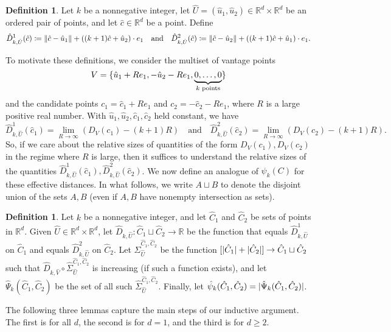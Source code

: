 \documentclass[11pt]{amsart}
\theoremstyle{definition}
\newtheorem{definition}[theorem]{Definition}
\DeclarePairedDelimiter{\set}{\{}{\}}
\DeclarePairedDelimiter{\abs}{\lvert}{\rvert}
\DeclarePairedDelimiter{\Abs}{\lVert}{\rVert}
\newcommand{\RR}{\mathbb{R}}
\begin{document}
\begin{definition}
Let $k$ be a nonnegative integer, let $\hat U = (\hat u_1, \hat u_2) \in \RR^d \times \RR^d$ be an ordered pair of points, and let $\hat c\in\RR^d$ be a point.  Define
\[
\hat{D}^1_{k,\hat U}(\hat c) \coloneqq \Abs{\hat c - \hat u_1} + ((k+1)\hat c + \hat u_2) \cdot  e_1 \quad\text{and}\quad
\hat{D}^2_{k,\hat U}(\hat c) \coloneqq \Abs{\hat c - \hat u_2} + ((k+1)\hat c + \hat u_1) \cdot e_1.
\]
\end{definition}

To motivate these definitions,
we consider the multiset of vantage points \[V = \set{\hat u_1 + Re_1, -\hat u_2 - Re_1, \underbrace{0,\ldots,0}_{k\text{ points}}}\] and the candidate points $c_1 = \hat c_1 + Re_1$ and $c_2 = -\hat c_2 - Re_1$, where $R$ is a large positive real number.  With $\hat u_1, \hat u_2, \hat c_1, \hat c_2$ held constant, we have
\[\hat{D}_{k,\hat U}^1(\hat c_1) = \lim\limits_{R \to \infty} (D_{V}(c_1) - (k+1)R) \quad\text{and}\quad
\hat{D}_{k,\hat U}^2(\hat c_2) = \lim\limits_{R \to \infty} (D_{V}(c_2) - (k+1)R).\]
So, if we care about the relative sizes of quantities of the form $D_V(c_1), D_V(c_2)$ in the regime where $R$ is large, then it suffices to understand the relative sizes of the quantities $\hat{D}_{k,\hat U}^1(\hat c_1), \hat{D}_{k,\hat U}^2(\hat c_2)$.  We now define an analogue of $\psi_k(C)$ for these effective distances.  In what follows, we write $A \sqcup B$ to denote the disjoint union of the sets $A,B$ (even if $A,B$ have nonempty intersection as sets).

\begin{definition} \label{def:hatpsi}
Let $k$ be a nonnegative integer, and let $\hat C_1$ and $\hat C_2$ be sets of points in $\RR^d$. Given $\hat U \in \RR^d \times \RR^d$, let $\hat D_{k,\hat U} \colon \hat C_1 \sqcup  \hat C_2 \to \RR$ be the function that equals $\hat D^1_{k,\hat U}$ on $\hat C_1$ and equals  $\hat D^2_{k,\hat U}$ on $\hat C_2$. Let $\hat \Sigma_{\hat U}^{\hat C_1,\hat C_2}$ be the function $[\abs{\hat C_1} + \abs{\hat C_2}] \to \hat C_1 \sqcup\hat C_2$ such that $\hat D_{k,\hat V} \circ \hat \Sigma_{\hat U}^{\hat C_1,\hat C_2}$ is increasing (if such a function exists), and let $\hat \Psi_k(\hat C_1, \hat C_2)$ be the set of all such $\hat \Sigma_{\hat U}^{\hat C_1,\hat C_2}$. Finally, let $\hat \psi_k(\hat C_1,\hat C_2) = \abs{\hat \Psi_k(\hat C_1,\hat C_2)}$.
\end{definition}

The following three lemmas capture the main steps of our inductive argument.  The first is for all $d$, the second is for $d=1$, and the third is for $d \geq 2$.
 
\end{document}
